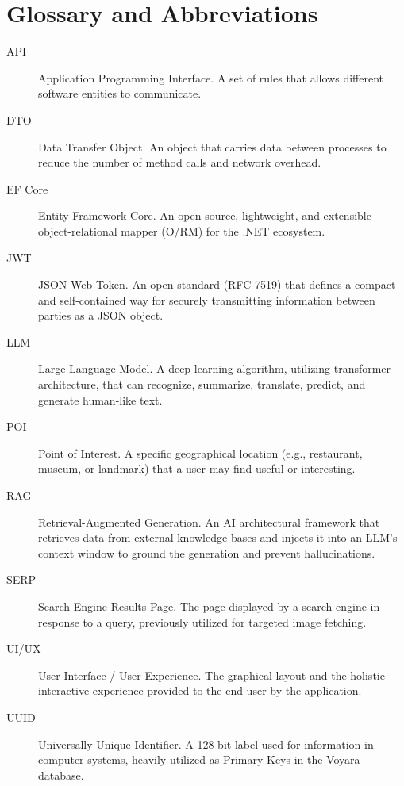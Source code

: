 \chapter*{Glossary and Abbreviations}

\begin{description}
    \item[API] Application Programming Interface. A set of rules that allows different software entities to communicate.
    \item[DTO] Data Transfer Object. An object that carries data between processes to reduce the number of method calls and network overhead.
    \item[EF Core] Entity Framework Core. An open-source, lightweight, and extensible object-relational mapper (O/RM) for the .NET ecosystem.
    \item[JWT] JSON Web Token. An open standard (RFC 7519) that defines a compact and self-contained way for securely transmitting information between parties as a JSON object.
    \item[LLM] Large Language Model. A deep learning algorithm, utilizing transformer architecture, that can recognize, summarize, translate, predict, and generate human-like text.
    \item[POI] Point of Interest. A specific geographical location (e.g., restaurant, museum, or landmark) that a user may find useful or interesting.
    \item[RAG] Retrieval-Augmented Generation. An AI architectural framework that retrieves data from external knowledge bases and injects it into an LLM's context window to ground the generation and prevent hallucinations.
    \item[SERP] Search Engine Results Page. The page displayed by a search engine in response to a query, previously utilized for targeted image fetching.
    \item[UI/UX] User Interface / User Experience. The graphical layout and the holistic interactive experience provided to the end-user by the application.
    \item[UUID] Universally Unique Identifier. A 128-bit label used for information in computer systems, heavily utilized as Primary Keys in the Voyara database.
\end{description}
